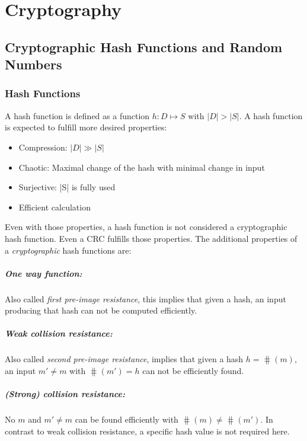 \chapter{Cryptography}
\section{Cryptographic Hash Functions and Random Numbers}
\subsection{Hash Functions}
A hash function is defined as a function $h: D \mapsto S$ with $|D| > |S|$. A
hash function is expected to fulfill more desired properties:
\begin{itemize}
    \item Compression: $|D| \gg |S|$
    \item Chaotic: Maximal change of the hash with minimal change in input
    \item Surjective: |S| is fully used
    \item Efficient calculation
\end{itemize}
Even with those properties, a hash function is not considered a cryptographic
hash function. Even a CRC fulfills those properties. The additional properties
of a \emph{cryptographic} hash functions are:

\paragraph{One way function:} Also called \emph{first pre-image resistance},
    this implies that given a hash, an input producing that hash can not be
    computed efficiently.

\paragraph{Weak collision resistance:} Also called \emph{second pre-image
    resistance}, implies that given a hash $h = \hash(m)$, an input $m' \neq m$
    with $\hash(m') = h$ can not be efficiently found.

\paragraph{(Strong) collision resistance:} No $m$ and $m' \neq m$ can be found
    efficiently with $\hash(m) \neq \hash(m')$. In contrast to weak collision
    resistance, a specific hash value is not required here.

